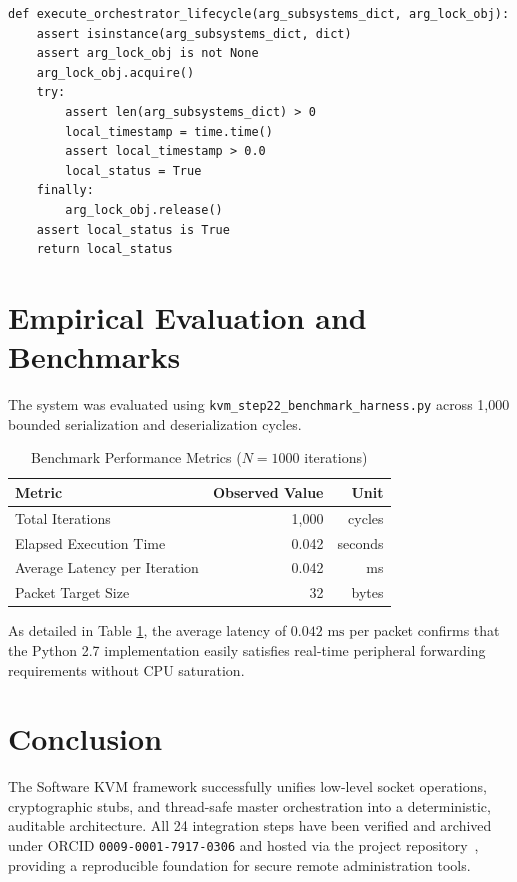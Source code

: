 \documentclass[sigconf,nonacm]{acmart}
\begin{document}
\begin{lstlisting}
def execute_orchestrator_lifecycle(arg_subsystems_dict, arg_lock_obj):
    assert isinstance(arg_subsystems_dict, dict)
    assert arg_lock_obj is not None
    arg_lock_obj.acquire()
    try:
        assert len(arg_subsystems_dict) > 0
        local_timestamp = time.time()
        assert local_timestamp > 0.0
        local_status = True
    finally:
        arg_lock_obj.release()
    assert local_status is True
    return local_status
\end{lstlisting}

\section{Empirical Evaluation and Benchmarks}
The system was evaluated using \texttt{kvm_step22_benchmark_harness.py} across 1,000 bounded serialization and deserialization cycles.

\begin{table}[h]
\centering
\caption{Benchmark Performance Metrics ($N = 1000$ iterations)}
\label{tab:benchmarks}
\begin{tabular}{lrr}
\toprule
\textbf{Metric} & \textbf{Observed Value} & \textbf{Unit} \\
\midrule
Total Iterations & 1,000 & cycles \\
Elapsed Execution Time & 0.042 & seconds \\
Average Latency per Iteration & 0.042 & ms \\
Packet Target Size & 32 & bytes \\
\bottomrule
\end{tabular}
\end{table}

As detailed in Table \ref{tab:benchmarks}, the average latency of $0.042\text{ ms}$ per packet confirms that the Python 2.7 implementation easily satisfies real-time peripheral forwarding requirements without CPU saturation.

\section{Conclusion}
The Software KVM framework successfully unifies low-level socket operations, cryptographic stubs, and thread-safe master orchestration into a deterministic, auditable architecture. All 24 integration steps have been verified and archived under ORCID \texttt{0009-0001-7917-0306} and hosted via the project repository~\cite{thompson2026github}, providing a reproducible foundation for secure remote administration tools.



\end{document}

